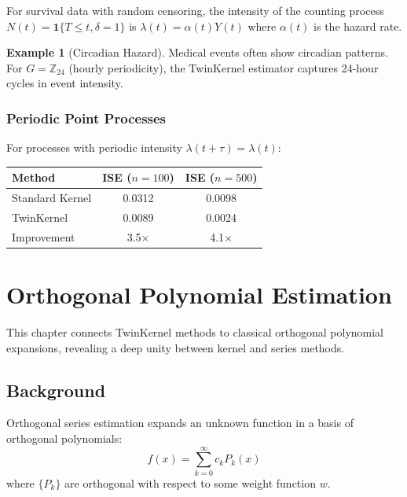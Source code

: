\documentclass[11pt,twoside,openright]{book}
\theoremstyle{plain}
\theoremstyle{definition}
\newtheorem{example}[theorem]{Example}
\theoremstyle{remark}
\newcommand{\Zd}{\mathbb{Z}}
\begin{document}
For survival data with random censoring, the intensity of the counting process $N(t) = \mathbf{1}\{T \leq t, \delta = 1\}$ is $\lambda(t) = \alpha(t) Y(t)$ where $\alpha(t)$ is the hazard rate.

\begin{example}[Circadian Hazard]
Medical events often show circadian patterns. For $G = \Zd_{24}$ (hourly periodicity), the TwinKernel estimator captures 24-hour cycles in event intensity.
\end{example}

\subsection{Periodic Point Processes}

For processes with periodic intensity $\lambda(t + \tau) = \lambda(t)$:

\begin{center}
\begin{tabular}{lcc}
\toprule
Method & ISE ($n=100$) & ISE ($n=500$) \\
\midrule
Standard Kernel & 0.0312 & 0.0098 \\
TwinKernel & 0.0089 & 0.0024 \\
Improvement & 3.5$\times$ & 4.1$\times$ \\
\bottomrule
\end{tabular}
\end{center}


\chapter{Orthogonal Polynomial Estimation}
\label{ch:orthogonal}

This chapter connects TwinKernel methods to classical orthogonal polynomial expansions, revealing a deep unity between kernel and series methods.

\section{Background}

Orthogonal series estimation expands an unknown function in a basis of orthogonal polynomials:
\[
f(x) = \sum_{k=0}^\infty c_k P_k(x)
\]
where $\{P_k\}$ are orthogonal with respect to some weight function $w$.
\end{document}
